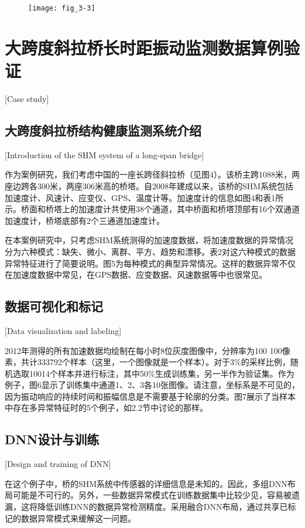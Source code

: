 \begin{figure}[!h]
\centering\texttt{[image: fig\_3-3]}
\vspace{0.2em}
\end{figure}


\section{大跨度斜拉桥长时距振动监测数据算例验证}[Case study]
\subsection{大跨度斜拉桥结构健康监测系统介绍}[Introduction of the SHM system of a long-span bridge]

作为案例研究，我们考虑中国的一座长跨径斜拉桥（见图4）。该桥主跨1088米，两座边跨各300米，两座306米高的桥塔。自2008年建成以来，该桥的SHM系统包括加速度计、风速计、应变仪、GPS、温度计等。加速度计的信息如图4和表1所示。桥面和桥塔上的加速度计共使用38个通道，其中桥面和桥塔顶部有16个双通道加速度计，桥塔底部有2个三通道加速度计。

在本案例研究中，只考虑SHM系统测得的加速度数据，将加速度数据的异常情况分为六种模式：缺失、微小、离群、平方、趋势和漂移。表2对这六种模式的数据异常特征进行了简要说明。图5为每种模式的典型异常情况。这样的数据异常不仅在加速度数据中常见，在GPS数据、应变数据、风速数据等中也很常见。

\subsection{数据可视化和标记}[Data visualization and labeling]

2012年测得的所有加速数据均绘制在每小时8位灰度图像中，分辨率为100 100像素，共计333792个样本（这里，一个图像就是一个样本）。对于3\%的采样比例，随机选取10014个样本并进行标注，其中50\%生成训练集，另一半作为验证集。作为例子，图6显示了训练集中通道1、2、3各10张图像。请注意，坐标系是不可见的，因为振动响应的持续时间和振幅信息是不需要基于轮廓的分类。图7展示了当样本中存在多异常特征时的5个例子，如2.2节中讨论的那样。

\subsection{DNN设计与训练}[Design and training of DNN]

在这个例子中，桥的SHM系统中传感器的详细信息是未知的。因此，多组DNN布局可能是不可行的。另外，一些数据异常模式在训练数据集中比较少见，容易被遗漏，这将降低训练DNN的数据异常检测精度。采用融合DNN布局，通过共享已标记的数据异常模式来缓解这一问题。

